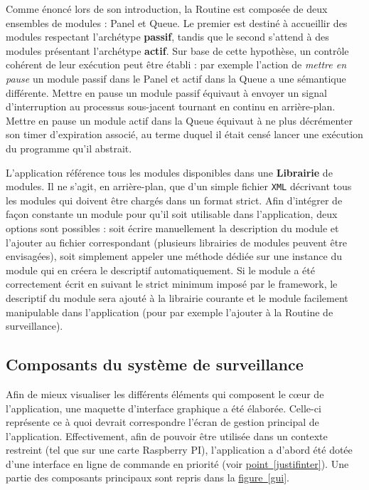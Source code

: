 \documentclass[]{article}
\newcommand{\wordlink}[2]{\hyperref[#1]{#2~\ref{#1}}}
\begin{document}
\par Comme énoncé lors de son introduction, la Routine est composée de deux ensembles de modules : Panel et Queue. Le premier est destiné à accueillir des modules respectant l'archétype \textbf{passif}, tandis que le second s'attend à des modules présentant l'archétype \textbf{actif}. Sur base de cette hypothèse, un contrôle cohérent de leur exécution peut être établi : par exemple l'action de \textit{mettre en pause} un module passif dans le Panel et actif dans la Queue a une sémantique différente. Mettre en pause un module passif équivaut à envoyer un signal d'interruption au processus sous-jacent tournant en continu en arrière-plan. Mettre en pause un module actif dans la Queue équivaut à ne plus décrémenter son timer d'expiration associé, au terme duquel il était censé lancer une exécution du programme qu'il abstrait.\\


\par L'application référence tous les modules disponibles dans une \textbf{Librairie} de modules. Il ne s'agit, en arrière-plan, que d'un simple fichier \texttt{XML} décrivant tous les modules qui doivent être chargés dans un format strict. Afin d'intégrer de façon constante un module pour qu'il soit utilisable dans l'application, deux options sont possibles : soit écrire manuellement la description du module et l'ajouter au fichier correspondant (plusieurs librairies de modules peuvent être envisagées), soit simplement appeler une méthode dédiée sur une instance du module qui en créera le descriptif automatiquement. Si le module a été correctement écrit en suivant le strict minimum imposé par le framework, le descriptif du module sera ajouté à la librairie courante et le module facilement manipulable dans l'application (pour par exemple l'ajouter à la Routine de surveillance).


\newpage

\subsection{Composants du système de surveillance}
\label{compapp}

Afin de mieux visualiser les différents éléments qui composent le cœur de l'application, une maquette d'interface graphique a été élaborée. Celle-ci représente ce à quoi devrait correspondre l'écran de gestion principal de l'application. Effectivement, afin de pouvoir être utilisée dans un contexte restreint (tel que sur une carte Raspberry PI), l'application a d'abord été dotée d'une interface en ligne de commande en priorité (voir \wordlink{justifinter}{point}). Une partie des composants principaux sont repris dans la 
\wordlink{gui}{figure}.
\end{document}
